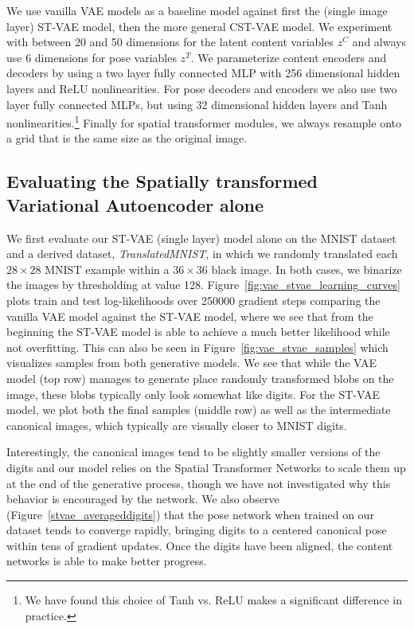 We use vanilla VAE models  as a baseline model against first the (single image layer) ST-VAE
model, then the more general CST-VAE model.
We experiment with between 20 and 50  dimensions for the latent content variables $z^C$
and always use 6 dimensions for pose variables $z^T$.
We parameterize content encoders and decoders
by using a two layer fully connected MLP with 256 dimensional
hidden layers and ReLU nonlinearities.
For pose decoders and encoders we also use two layer fully connected MLPs, but 
using 32 dimensional hidden layers and Tanh nonlinearities.\footnote{
%
We have found this choice of Tanh vs. ReLU makes a significant
difference in practice.
}
Finally for spatial transformer modules, we always resample onto a grid that is the same size as the original
image.



\subsection{Evaluating the Spatially transformed Variational Autoencoder alone}

We first evaluate our ST-VAE (single layer) model alone on the MNIST dataset~\citep{lecun1998gradient}
and a derived dataset, \emph{TranslatedMNIST}, in which we randomly translated each  $28\times 28$ MNIST example
within a $36\times 36$ black image.  In both cases, we binarize the images by thresholding at value 128.
Figure~\ref{fig:vae_stvae_learning_curves} plots train and test log-likelihoods over 250000 gradient steps
comparing the vanilla VAE model against the ST-VAE model, where we see that from the beginning the ST-VAE
model is able to achieve a much better likelihood while not overfitting.  This can also be seen in Figure~\ref{fig:vae_stvae_samples}
which visualizes samples from both generative models.   We see that while the VAE model (top row) manages to 
generate place randomly transformed blobs on the image, these blobs typically only look somewhat like digits. 
For the ST-VAE model, we plot both the final samples (middle row) as well as the intermediate canonical images, 
which typically are visually closer to MNIST digits. 

Interestingly, the canonical images tend to be slightly smaller versions
of the digits and our model relies on the Spatial Transformer Networks to scale them up at the end of the generative process,
though we have not investigated why this behavior is encouraged by the network.  We also observe (Figure~\ref{stvae_averageddigits})
that the pose network when trained on our dataset tends to converge rapidly, bringing digits to a centered canonical pose
within tens of gradient updates. 
Once the digits have been aligned, the content networks is able to make better progress.

